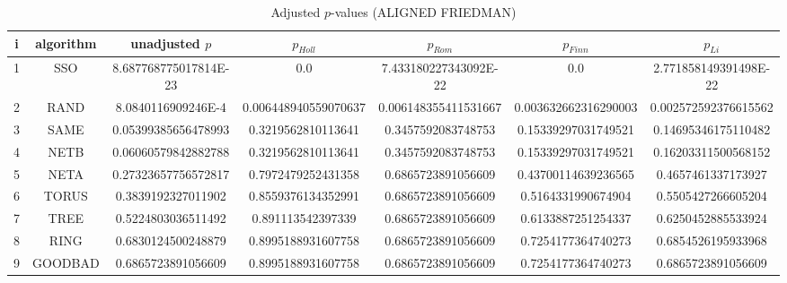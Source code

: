 \documentclass[a4paper,10pt]{article}
\begin{document}
\begin{landscape}
\begin{table}[!htp]
\centering\scriptsize
\caption{Adjusted $p$-values (ALIGNED FRIEDMAN)}
\begin{tabular}{ccccccc}
i&algorithm&unadjusted $p$&$p_{Holl}$&$p_{Rom}$&$p_{Finn}$&$p_{Li}$\\
\hline
1& SSO&8.687768775017814E-23&0.0&7.433180227343092E-22&0.0&2.771858149391498E-22\\
2& RAND&8.0840116909246E-4&0.006448940559070637&0.006148355411531667&0.003632662316290003&0.002572592376615562\\
3& SAME&0.05399385656478993&0.3219562810113641&0.3457592083748753&0.15339297031749521&0.14695346175110482\\
4& NETB&0.06060579842882788&0.3219562810113641&0.3457592083748753&0.15339297031749521&0.16203311500568152\\
5& NETA&0.27323657756572817&0.7972479252431358&0.6865723891056609&0.43700114639236565&0.4657461337173927\\
6& TORUS&0.3839192327011902&0.8559376134352991&0.6865723891056609&0.5164331990674904&0.5505427266605204\\
7& TREE&0.5224803036511492&0.891113542397339&0.6865723891056609&0.6133887251254337&0.6250452885533924\\
8& RING&0.6830124500248879&0.8995188931607758&0.6865723891056609&0.7254177364740273&0.6854526195933968\\
9& GOODBAD&0.6865723891056609&0.8995188931607758&0.6865723891056609&0.7254177364740273&0.6865723891056609\\
\hline
\end{tabular}
\end{table}


\newpage


\end{landscape}
\end{document}
